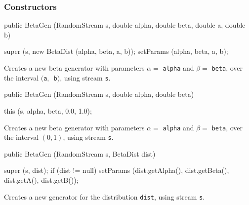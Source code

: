 \subsubsection* {Constructors}
\begin{code}

   public BetaGen (RandomStream s, double alpha, double beta,
                                   double a, double b) \begin{hide} {
      super (s, new BetaDist (alpha, beta, a, b));
      setParams (alpha, beta, a, b);
   }\end{hide}
\end{code}
  \begin{tabb}  Creates a new beta generator with parameters $\alpha =$ 
     \texttt{alpha} and $\beta =$ \texttt{beta}, over the interval
    $($\texttt{a}$,$~\texttt{b}$)$, using stream \texttt{s}.
\end{tabb}
\begin{code}

   public BetaGen (RandomStream s, double alpha, double beta) \begin{hide} {
      this (s, alpha, beta, 0.0, 1.0);
   }\end{hide}
\end{code}
\begin{tabb} Creates a new beta generator with parameters $\alpha =$ 
     \texttt{alpha} and $\beta =$ \texttt{beta}, over the interval $(0,1)$,
   using stream \texttt{s}.
\end{tabb}
\begin{code}

   public BetaGen (RandomStream s, BetaDist dist) \begin{hide} {
      super (s, dist);
      if (dist != null)
         setParams (dist.getAlpha(), dist.getBeta(), dist.getA(), dist.getB());
   }\end{hide}
\end{code}
\begin{tabb} Creates a new generator for the distribution \texttt{dist},
     using stream \texttt{s}.
\end{tabb}


